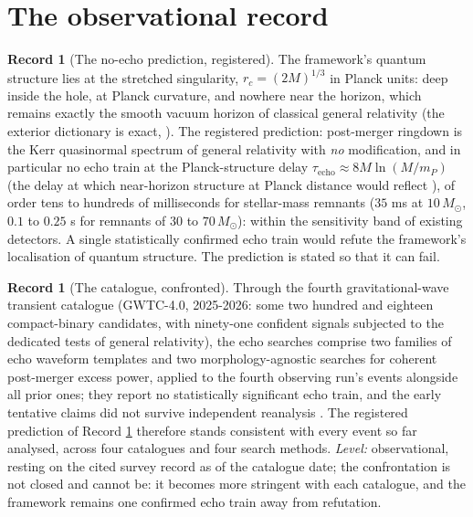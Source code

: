 \documentclass[11pt]{article}
\theoremstyle{definition}
\newtheorem{record}[theorem]{Record}
\begin{document}
\section{The observational record}\label{sec:record}

\begin{record}[The no-echo prediction, registered]\label{rec:echo}
The framework's quantum structure lies at the stretched singularity, $r_c = (2M)^{1/3}$ in Planck units: deep inside the hole, at Planck curvature, and nowhere near the horizon, which remains exactly the smooth vacuum horizon of classical general relativity (the exterior dictionary is exact, \cite[Fact 2.1]{ButlerT6}). The registered prediction: post-merger ringdown is the Kerr quasinormal spectrum of general relativity with \emph{no} modification, and in particular no echo train at the Planck-structure delay $\tau_{\mathrm{echo}} \approx 8M\ln(M/m_P)$ (the delay at which near-horizon structure at Planck distance would reflect \cite{CardosoPani2017}), of order tens to hundreds of milliseconds for stellar-mass remnants ($35$ ms at $10\,M_\odot$, $0.1$ to $0.25$ s for remnants of $30$ to $70\,M_\odot$): within the sensitivity band of existing detectors. A single statistically confirmed echo train would refute the framework's localisation of quantum structure. The prediction is stated so that it can fail.
\end{record}

\begin{record}[The catalogue, confronted]\label{rec:catalogue}
Through the fourth gravitational-wave transient catalogue (GWTC-4.0, 2025-2026: some two hundred and eighteen compact-binary candidates, with ninety-one confident signals subjected to the dedicated tests of general relativity), the echo searches comprise two families of echo waveform templates and two morphology-agnostic searches for coherent post-merger excess power, applied to the fourth observing run's events alongside all prior ones; they report no statistically significant echo train, and the early tentative claims \cite{Abedi2017} did not survive independent reanalysis \cite{Westerweck2018, GWTC4TGR2026}. The registered prediction of Record \ref{rec:echo} therefore stands consistent with every event so far analysed, across four catalogues and four search methods. \emph{Level:} observational, resting on the cited survey record as of the catalogue date; the confrontation is not closed and cannot be: it becomes more stringent with each catalogue, and the framework remains one confirmed echo train away from refutation.
\end{record}
\end{document}
